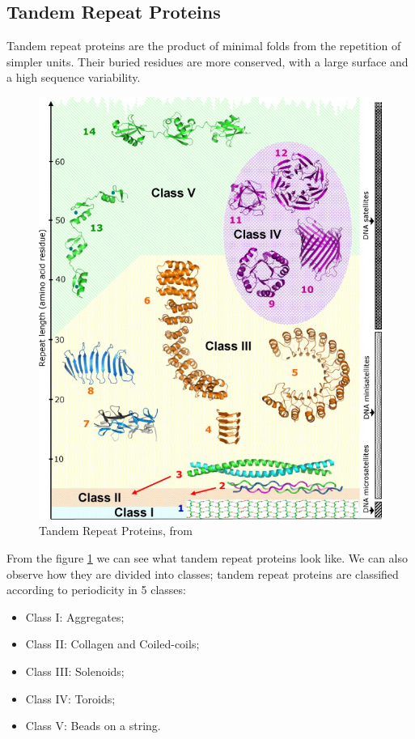 \vspace{10em}

\subsection{Tandem Repeat Proteins}
Tandem repeat proteins are the product of minimal folds from the repetition of simpler units. Their buried residues are more conserved, with a large surface and a high sequence variability.

\begin{figure}[h!]
	\includegraphics[scale=0.6]{res/proteins_overview/tandem.jpg}
	\centering
	\caption{Tandem Repeat Proteins, from \cite{tandem}}
	\label{fig:tandem}
\end{figure}

From the figure \ref{fig:tandem} we can see what tandem repeat proteins look like. We can also observe how they are divided into classes; tandem repeat proteins are classified according to periodicity in 5 classes:
\begin{itemize}
	\item Class I: Aggregates;
	\item Class II: Collagen and Coiled-coils;
	\item Class III: Solenoids;
	\item Class IV: Toroids;
	\item Class V: Beads on a string.
\end{itemize}

